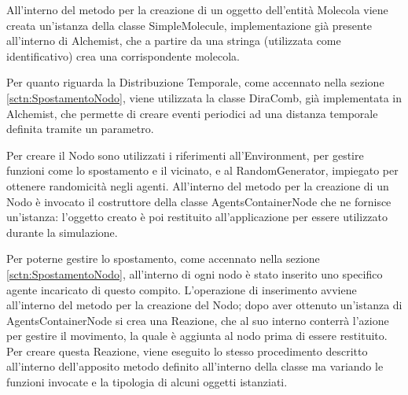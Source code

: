 All'interno del metodo per la creazione di un oggetto dell'entità Molecola viene creata un'istanza della classe SimpleMolecule, implementazione già presente all'interno di Alchemist, che a partire da una stringa (utilizzata come identificativo) crea una corrispondente molecola.

Per quanto riguarda la Distribuzione Temporale, come accennato nella sezione \ref{sctn:SpostamentoNodo}, viene utilizzata la classe DiraComb, già implementata in Alchemist, che permette di creare eventi periodici ad una distanza temporale definita tramite un parametro.

Per creare il Nodo sono utilizzati i riferimenti all'Environment, per gestire funzioni come lo spostamento e il vicinato, e al RandomGenerator, impiegato per ottenere randomicità negli agenti. All'interno del metodo per la creazione di un Nodo è invocato il costruttore della classe AgentsContainerNode che ne fornisce un'istanza: l'oggetto creato è poi restituito all'applicazione per essere utilizzato durante la simulazione.

Per poterne gestire lo spostamento, come accennato nella sezione \ref{sctn:SpostamentoNodo}, all'interno di ogni nodo è stato inserito uno specifico agente incaricato di questo compito. L'operazione di inserimento avviene all'interno del metodo per la creazione del Nodo; dopo aver ottenuto un'istanza di AgentsContainerNode si crea una Reazione, che al suo interno conterrà l'azione per gestire il movimento, la quale è aggiunta al nodo prima di essere restituito.
\\
Per creare questa Reazione, viene eseguito lo stesso procedimento descritto all'interno dell'apposito metodo definito all'interno della classe ma variando le funzioni invocate e la tipologia di alcuni oggetti istanziati.

